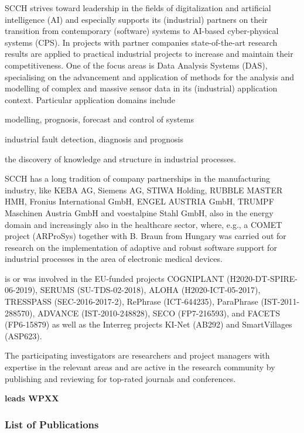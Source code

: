 \documentclass[a4paper,11pt]{article}
\begin{document}
SCCH strives toward leadership in the fields of digitalization and artificial intelligence (AI) and especially supports its (industrial) partners on their transition from contemporary (software) systems to AI-based cyber-physical systems (CPS). In projects with partner companies state-of-the-art research results are applied to practical industrial projects to increase and maintain their competitiveness. One of the focus areas is Data Analysis Systems (DAS), specialising on the advancement and application of methods for the analysis and modelling of complex and massive sensor data in its (industrial) application context. Particular application domains include
\begin{inparaenum}[a)]
\item modelling, prognosis, forecast and control of systems
\item industrial fault detection, diagnosis and prognosis
\item the discovery of knowledge and structure in industrial processes.
\end{inparaenum}
SCCH has a long tradition of company partnerships in the manufacturing industry, like KEBA AG, Siemens AG, STIWA Holding, RUBBLE MASTER HMH, Fronius International GmbH, ENGEL AUSTRIA GmbH, TRUMPF Maschinen Austria GmbH and voestalpine Stahl GmbH, also in the energy domain and increasingly also in the healthcare sector, where, e.g., a COMET project (ARProSys) together with B. Braun from Hungary was carried out for research on the implementation of adaptive and robust software support for industrial processes in the area of electronic medical devices. 

\SCCHshort{} is or was involved in the EU-funded projects COGNIPLANT (H2020-DT-SPIRE-06-2019), SERUMS (SU-TDS-02-2018), ALOHA (H2020-ICT-05-2017), TRESSPASS (SEC-2016-2017-2), RePhrase (ICT-644235), ParaPhrase (IST-2011-288570), ADVANCE (IST-2010-248828), SECO (FP7-216593), and FACETS (FP6-15879) as well as the Interreg projects KI-Net (AB292) and SmartVillages (ASP623).

The participating investigators are researchers and project managers with expertise in the relevant areas and are active in the research community by publishing and reviewing for top-rated journals and conferences.

\vspace{10pt}
\textbf{\SCCHshort{} leads WPXX}
\vspace{10pt}

\subsubsection*{List of Publications}
\end{document}
